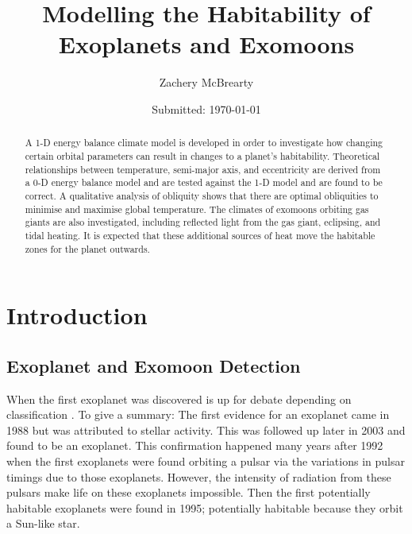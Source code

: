 \documentclass[12pt, onecolumn]{revtex4-2}    %
\begin{document}
\title{Modelling the Habitability of Exoplanets and Exomoons}
\date{Submitted: \today{}}
\author{Zachery McBrearty}

\begin{abstract}
  A 1-D energy balance climate model is developed in order to investigate how changing certain orbital parameters can result in changes to a planet's habitability.
  Theoretical relationships between temperature, semi-major axis, and eccentricity are derived from a 0-D energy balance model and are tested against the 1-D model and are found to be correct.
  A qualitative analysis of obliquity shows that there are optimal obliquities to minimise and maximise global temperature.
  The climates of exomoons orbiting gas giants are also investigated, including reflected light from the gas giant, eclipsing, and tidal heating.
  It is expected that these additional sources of heat move the habitable zones for the planet outwards.
\end{abstract}


\maketitle


\tableofcontents



\section{Introduction} \label{sec:Introduction} %
%
\subsection{Exoplanet and Exomoon Detection} \label{ssec:ExoplanetExomoonDetection}
%
When the first exoplanet was discovered is up for debate depending on classification \cite{ESA_2019}.
To give a summary:
The first evidence for an exoplanet came in 1988 but was attributed to stellar activity.
This was followed up later in 2003 and found to be an exoplanet.
This confirmation happened many years after 1992 when the first exoplanets were found orbiting a pulsar via the variations in pulsar timings due to those exoplanets.
However, the intensity of radiation from these pulsars make life on these exoplanets impossible.
Then the first potentially habitable exoplanets were found in 1995; potentially habitable because they orbit a Sun-like star.
\end{document}
